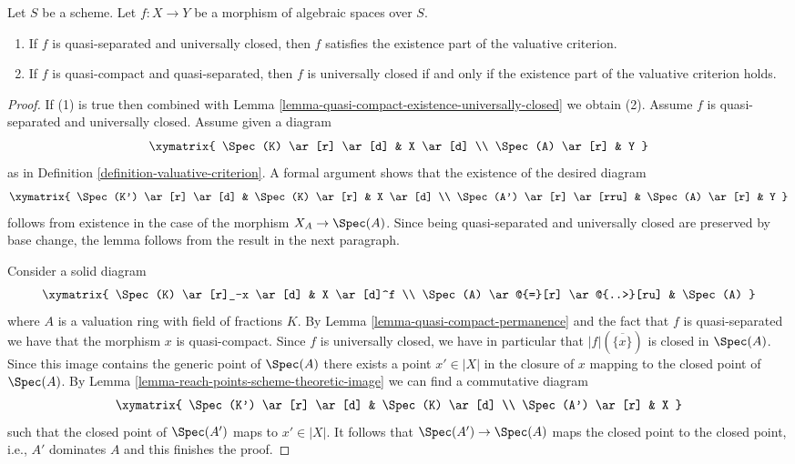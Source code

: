 \begin{lemma}
\label{lemma-characterize-universally-closed-quasi-separated}
Let $S$ be a scheme. Let $f : X \to Y$ be a
morphism of algebraic spaces over $S$.
\begin{enumerate}
\item If $f$ is quasi-separated and universally closed, then
$f$ satisfies the existence part of the valuative criterion.
\item If $f$ is quasi-compact and quasi-separated, then
$f$ is universally closed if and only if the existence part of the
valuative criterion holds.
\end{enumerate}
\end{lemma}

\begin{proof}
If (1) is true then combined with
Lemma \ref{lemma-quasi-compact-existence-universally-closed}
we obtain (2). Assume $f$ is quasi-separated and universally closed.
Assume given a diagram
$$
\xymatrix{
\Spec(K) \ar[r] \ar[d] & X \ar[d] \\
\Spec(A) \ar[r] & Y
}
$$
as in Definition \ref{definition-valuative-criterion}.
A formal argument shows that the existence of the desired diagram
$$
\xymatrix{
\Spec(K') \ar[r] \ar[d] & \Spec(K) \ar[r] & X \ar[d] \\
\Spec(A') \ar[r] \ar[rru] & \Spec(A) \ar[r] & Y
}
$$
follows from existence in the case of the morphism $X_A \to \Spec(A)$.
Since being quasi-separated and universally closed are preserved
by base change, the lemma follows from the result in the next paragraph.

\medskip\noindent
Consider a solid diagram
$$
\xymatrix{
\Spec(K) \ar[r]_-x \ar[d] & X \ar[d]^f \\
\Spec(A) \ar@{=}[r] \ar@{..>}[ru] & \Spec(A)
}
$$
where $A$ is a valuation ring with field of fractions $K$.
By Lemma \ref{lemma-quasi-compact-permanence} and the fact
that $f$ is quasi-separated we have that
the morphism $x$ is quasi-compact.
Since $f$ is universally closed, we have in particular
that $|f|(\overline{\{x\}})$ is closed in $\Spec(A)$.
Since this image contains the generic point of $\Spec(A)$
there exists a point $x' \in |X|$ in the closure
of $x$ mapping to the closed point of $\Spec(A)$.
By Lemma \ref{lemma-reach-points-scheme-theoretic-image}
we can find a commutative diagram
$$
\xymatrix{
\Spec(K') \ar[r] \ar[d] & \Spec(K) \ar[d] \\
\Spec(A') \ar[r] & X
}
$$
such that the closed point of $\Spec(A')$ maps to $x' \in |X|$.
It follows that $\Spec(A') \to \Spec(A)$ maps the closed point
to the closed point, i.e., $A'$ dominates $A$ and this finishes the proof.
\end{proof}

